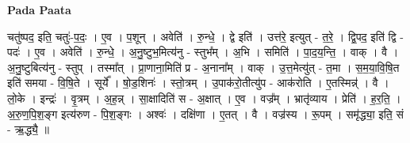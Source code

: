 \documentclass[17pt]{extarticle}
\begin{document}
\textbf{Pada Paata} \newline

चतु॑ष्पद॒ इति॒ चतुः॑-प॒दः॒ । ए॒व । प॒शून् । अवेति॑ । रु॒न्धे॒ । द्वे इति॑ । उत्त॑रे॒ इत्युत् - त॒रे॒ । द्वि॒पद॒ इति॑ द्वि - पदः॑ । ए॒व । अवेति॑ । रु॒न्धे॒ । अ॒नु॒ष्टुभ॒मित्य॑नु - स्तुभ᳚म् । अ॒भि । समिति॑ । पा॒द॒य॒न्ति॒ । वाक् । वै । अ॒नु॒ष्टुबित्य॑नु - स्तुप् । तस्मा᳚त् । प्रा॒णाना॒मिति॑ प्र - अ॒नाना᳚म् । वाक् । उ॒त्त॒मेत्यु॑त् - त॒मा । स॒म॒या॒वि॒षि॒त इति॑ समया - वि॒षि॒ते । सूर्ये᳚ । षो॒ड॒शिनः॑ । स्तो॒त्रम् । उ॒पाक॑रो॒तीत्यु॑प - आक॑रोति । ए॒तस्मिन्न्॑ । वै । लो॒के । इन्द्रः॑ । वृ॒त्रम् । अ॒ह॒न्न् । सा॒क्षादिति॑ स - अ॒क्षात् । ए॒व । वज्र᳚म् । भ्रातृ॑व्याय । प्रेति॑ । ह॒र॒ति॒ । अ॒रु॒ण॒पि॒श॒ङ्ग इत्य॑रुण - पि॒श॒ङ्गः । अश्वः॑ । दक्षि॑णा । ए॒तत् । वै । वज्र॑स्य । रू॒पम् । समृ॑द्ध्या॒ इति॒ सं - ऋ॒द्ध्यै॒ ॥  \newline
\end{document}
